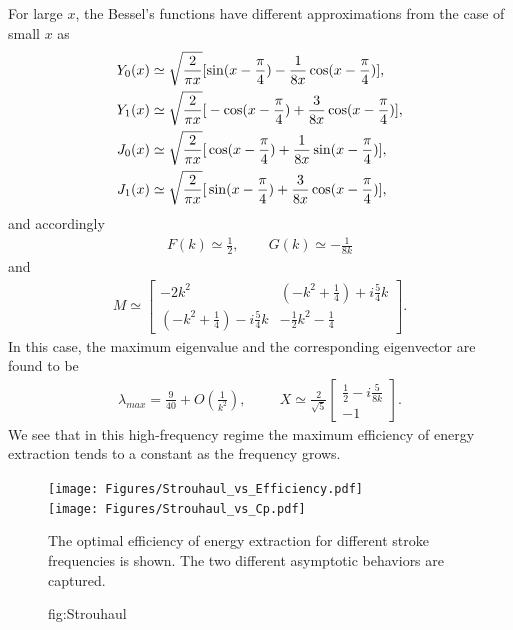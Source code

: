 For large $x$, the Bessel's functions have different approximations from the case of small $x$ as
\begin{align}
Y_0(x) & \simeq  \sqrt{\frac{2}{\pi x}} [ \sin (x-\frac{\pi}{4}) - \frac{1}{8x} \cos (x - \frac{\pi}{4}) ], \\
Y_1(x) & \simeq  \sqrt{\frac{2}{\pi x}} \large{[} -\cos (x-\frac{\pi}{4})+\frac{3}{8x} \cos (x - \frac{\pi}{4}) \large{]}, \\
J_0(x) & \simeq  \sqrt{\frac{2}{\pi x}} \large{[} \cos (x-\frac{\pi}{4}) + \frac{1}{8x} \sin (x - \frac{\pi}{4}) \large{]}, \\
J_1(x) & \simeq  \sqrt{\frac{2}{\pi x}} \large{[} \sin (x-\frac{\pi}{4}) + \frac{3}{8x} \cos (x - \frac{\pi}{4}) \large{]},
\end{align}
and accordingly
\begin{align}
F(k) \simeq \frac{1}{2},   \hspace{25pt}  G(k) \simeq -\frac{1}{8k}
\end{align}
and
\begin{align}
M \simeq \begin{bmatrix}   -2k^2   &  (-k^2+\frac{1}{4}) + i\frac{5}{4}k  \\
                        (-k^2+\frac{1}{4}) - i\frac{5}{4}k &   -\frac{1}{2}k^2-\frac{1}{4}  \end{bmatrix}.
\end{align}
In this case, the maximum eigenvalue and the corresponding eigenvector are found to be
\begin{align}
\lambda_{max} = \frac{9}{40} + O(\frac{1}{k^2}), \hspace{1cm}
X \simeq \frac{2}{\sqrt{5}}
\begin{bmatrix} \frac{1}{2} - i \frac{5}{8k}   \\     -1     \end{bmatrix}.
\end{align}
We see that in this high-frequency regime the maximum efficiency of energy extraction tends to a constant as the frequency grows.


\begin{figure}
\begin{center}
\begin{tabular}
\texttt{[image: Figures/Strouhaul\_vs\_Efficiency.pdf]} \\
\texttt{[image: Figures/Strouhaul\_vs\_Cp.pdf]}
\end{tabular}
\caption[The optimal energy efficient for different stroke frequencies]{The optimal efficiency of energy extraction for different stroke frequencies is shown. The two different asymptotic behaviors are captured.}
\end{center}
\caption{fig:Strouhaul}
\end{figure}
